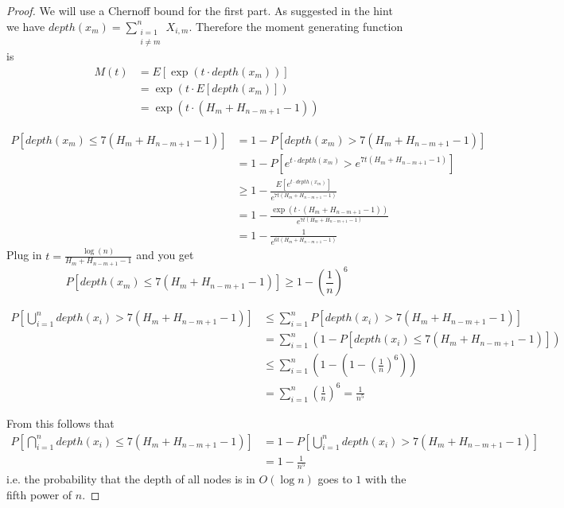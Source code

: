 \documentclass[10pt,a4paper]{article}
\begin{document}
\begin{proof}
  We will use a Chernoff bound for the first part.
  As suggested in the hint we have $depth(x_{m}) = \sum_{\substack{i = 1\\i \ne m}}^{n} X_{i,m}$.
  Therefore the moment generating function is
  \begin{align*}
    M(t) & = E[\exp(t \cdot depth(x_{m}))]\\
         & = \exp(t \cdot E[depth(x_{m})])\\
         & = \exp(t \cdot (H_{m} + H_{n - m + 1} - 1))
  \end{align*}

  \begin{align*}
    P[depth(x_{m}) \le 7(H_{m} + H_{n - m + 1} - 1)] & = 1 - P[depth(x_{m}) > 7(H_{m} + H_{n - m + 1} - 1)]\\
                                                     & = 1 - P[e^{t \cdot depth(x_{m})} > e^{7t(H_{m} + H_{n - m + 1} - 1)}]\\
                                                     & \ge 1 - \frac{E[e^{t \cdot depth(x_{m})}]}{e^{7t(H_{m} + H_{n - m + 1} - 1)}}\\
                                                     & = 1 - \frac{\exp(t \cdot (H_{m} + H_{n - m + 1} - 1))}{e^{7t(H_{m} + H_{n - m + 1} - 1)}}\\
                                                     & = 1 - \frac{1}{e^{6t(H_{m} + H_{n - m + 1} - 1)}}
  \end{align*}
  Plug in $t = \frac{\log(n)}{H_{m} + H_{n - m + 1} - 1}$ and you get
  \begin{equation*}
    P[depth(x_{m}) \le 7(H_{m} + H_{n - m + 1} - 1)] \ge 1 - \left( \frac{1}{n} \right)^{6}
  \end{equation*}

  \begin{align*}
    P\left[ \bigcup_{i = 1}^{n} depth(x_{i}) > 7(H_{m} + H_{n - m + 1} - 1) \right] & \le \sum_{i = 1}^{n} P[depth(x_{i}) > 7(H_{m} + H_{n - m + 1} - 1)]\\
    & = \sum_{i = 1}^{n} \left( 1 - P[depth(x_{i}) \le 7(H_{m} + H_{n - m + 1} - 1)] \right)\\
    & \le \sum_{i = 1}^{n} \left( 1 - \left( 1 - \left( \frac{1}{n} \right)^{6} \right) \right)\\
                                                                                    & = \sum_{i = 1}^{n} \left( \frac{1}{n} \right)^{6} = \frac{1}{n^{5}}
  \end{align*}

  From this follows that
  \begin{align*}
    P\left[ \bigcap_{i = 1}^{n} depth(x_{i}) \le 7(H_{m} + H_{n - m + 1} - 1) \right] & = 1 - P\left[ \bigcup_{i = 1}^{n} depth(x_{i}) > 7(H_{m} + H_{n - m + 1} - 1) \right]\\
                                                                                      & = 1 - \frac{1}{n^{5}}
  \end{align*}
  i.e. the probability that the depth of all nodes is in $O(\log n)$ goes to $1$ with the fifth power of $n$.
\end{proof}
\end{document}

